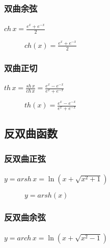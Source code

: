 \subsubsection{双曲余弦}
\paragraph{}
$ch \, x = \frac{e^x + e^{-x}}{2}$

\begin{figure}[H]
  \centering
    
    \caption{$ch(x) = \frac{e^x + e^{-x}}{2}$}
    \label{ch_x}
\end{figure}

\subsubsection{双曲正切}
\paragraph{}
$th \, x = \frac{sh \, x}{ch \, x} = \frac{e^x - e^{-x}}{e^x + e^{-x}}$


\begin{figure}[H]
  \centering
    
    \caption{$th(x) = \frac{e^x - e^{-x}}{e^x + e^{-x}}$}
    \label{th_x}
\end{figure}

\subsection{反双曲函数}
\subsubsection{反双曲正弦}
\paragraph{}
$y = arsh \, x = \ln(x + \sqrt{x^2 + 1})$

\begin{figure}[H]
  \centering
    
    \caption{$y = arsh(x)$}
    \label{arsh_x}
\end{figure}

\subsubsection{反双曲余弦}
\paragraph{}
$y = arch \, x = \ln(x + \sqrt{x^2 - 1})$

